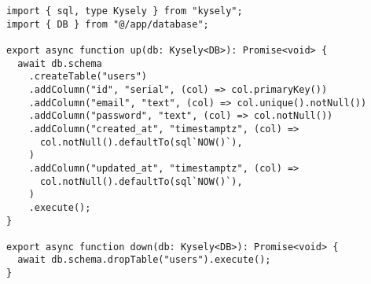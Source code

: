 \begin{verbatim}
import { sql, type Kysely } from "kysely";
import { DB } from "@/app/database";

export async function up(db: Kysely<DB>): Promise<void> {
  await db.schema
    .createTable("users")
    .addColumn("id", "serial", (col) => col.primaryKey())
    .addColumn("email", "text", (col) => col.unique().notNull())
    .addColumn("password", "text", (col) => col.notNull())
    .addColumn("created_at", "timestamptz", (col) =>
      col.notNull().defaultTo(sql`NOW()`),
    )
    .addColumn("updated_at", "timestamptz", (col) =>
      col.notNull().defaultTo(sql`NOW()`),
    )
    .execute();
}

export async function down(db: Kysely<DB>): Promise<void> {
  await db.schema.dropTable("users").execute();
}
\end{verbatim}